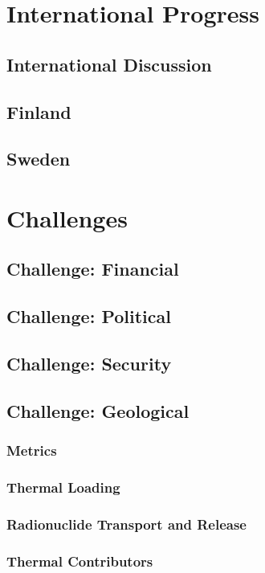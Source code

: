 \documentclass[9pt]{beamer}
\begin{document}
\section{International Progress}
\subsection{International Discussion}
\subsection{Finland}

\subsection{Sweden}

\section{Challenges}
\subsection{Challenge: Financial}

\subsection{Challenge: Political}

\subsection{Challenge: Security}

\subsection{Challenge: Geological}
\subsubsection{Metrics}

\subsubsection{Thermal Loading}

\subsubsection{Radionuclide Transport and Release}

\subsubsection{Thermal Contributors}

\end{document}
